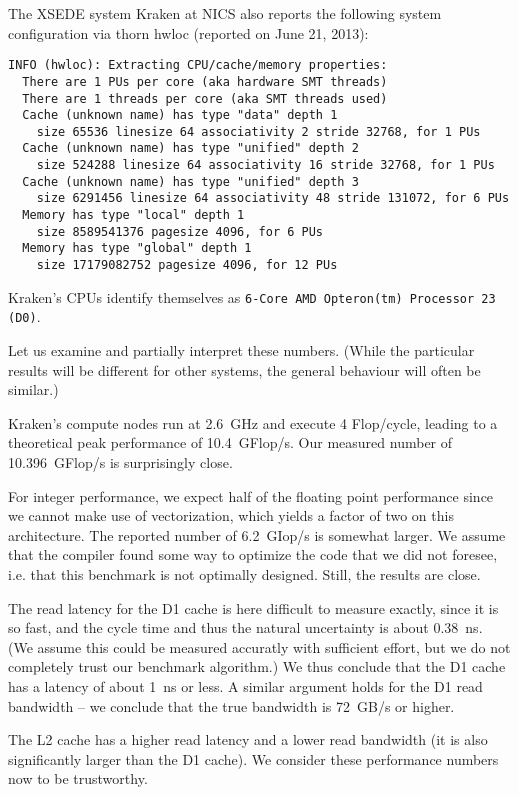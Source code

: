 The XSEDE system Kraken at NICS also reports the following system
configuration via thorn hwloc (reported on June 21, 2013):
\begin{verbatim}
INFO (hwloc): Extracting CPU/cache/memory properties:
  There are 1 PUs per core (aka hardware SMT threads)
  There are 1 threads per core (aka SMT threads used)
  Cache (unknown name) has type "data" depth 1
    size 65536 linesize 64 associativity 2 stride 32768, for 1 PUs
  Cache (unknown name) has type "unified" depth 2
    size 524288 linesize 64 associativity 16 stride 32768, for 1 PUs
  Cache (unknown name) has type "unified" depth 3
    size 6291456 linesize 64 associativity 48 stride 131072, for 6 PUs
  Memory has type "local" depth 1
    size 8589541376 pagesize 4096, for 6 PUs
  Memory has type "global" depth 1
    size 17179082752 pagesize 4096, for 12 PUs
\end{verbatim}

Kraken's CPUs identify themselves as
\verb+6-Core AMD Opteron(tm) Processor 23 (D0)+.

Let us examine and partially interpret these numbers. (While the
particular results will be different for other systems, the general
behaviour will often be similar.)

Kraken's compute nodes run at 2.6~GHz and execute 4 Flop/cycle,
leading to a theoretical peak performance of 10.4~GFlop/s. Our
measured number of 10.396~GFlop/s is surprisingly close.

For integer performance, we expect half of the floating point
performance since we cannot make use of vectorization, which yields a
factor of two on this architecture. The reported number of 6.2~GIop/s
is somewhat larger. We assume that the compiler found some way to
optimize the code that we did not foresee, i.e. that this benchmark is
not optimally designed. Still, the results are close.

The read latency for the D1 cache is here difficult to measure
exactly, since it is so fast, and the cycle time and thus the natural
uncertainty is about 0.38~ns. (We assume this could be measured
accuratly with sufficient effort, but we do not completely trust our
benchmark algorithm.) We thus conclude that the D1 cache has a latency
of about 1~ns or less. A similar argument holds for the D1 read
bandwidth -- we conclude that the true bandwidth is 72~GB/s or higher.

The L2 cache has a higher read latency and a lower read bandwidth (it
is also significantly larger than the D1 cache). We consider these
performance numbers now to be trustworthy.


